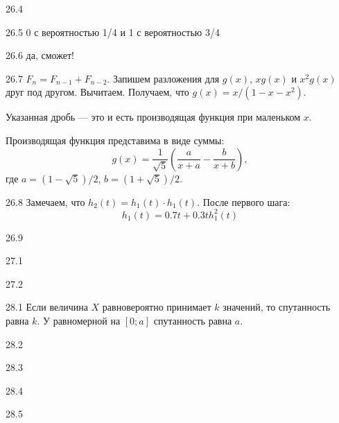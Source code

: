 \protect \hypertarget {soln:26.4}{}
\begin{solution}{{26.4}}
\end{solution}
\protect \hypertarget {soln:26.5}{}
\begin{solution}{{26.5}}
  0 с вероятностью 1/4 и 1 с вероятностью 3/4
\end{solution}
\protect \hypertarget {soln:26.6}{}
\begin{solution}{{26.6}}
  да, сможет!
\end{solution}
\protect \hypertarget {soln:26.7}{}
\begin{solution}{{26.7}}
$F_n = F_{n-1} + F_{n-2}$.
Запишем разложения для $g(x)$, $xg(x)$ и $x^2 g(x)$ друг под другом. Вычитаем. Получаем, что $g(x) = x/(1-x-x^2)$.

Указанная дробь — это и есть производящая функция при маленьком $x$.

Производящая функция представима в виде суммы:
\[
g(x) = \frac{1}{\sqrt{5}}\left( \frac{a}{x+a} - \frac{b}{x+b}  \right),
\]
где $a=(1-\sqrt{5})/2$, $b=(1+\sqrt{5})/2$.
\end{solution}
\protect \hypertarget {soln:26.8}{}
\begin{solution}{{26.8}}
Замечаем, что $h_2(t)=h_1(t)\cdot h_1(t)$. После первого шага:
\[
h_1(t) = 0.7t + 0.3th^2_1(t)
\]
\end{solution}
\protect \hypertarget {soln:26.9}{}
\begin{solution}{{26.9}}

\end{solution}
\protect \hypertarget {soln:27.1}{}
\begin{solution}{{27.1}}
\end{solution}
\protect \hypertarget {soln:27.2}{}
\begin{solution}{{27.2}}
\end{solution}
\protect \hypertarget {soln:28.1}{}
\begin{solution}{{28.1}}
  Если величина $X$ равновероятно принимает $k$ значений, то спутанность равна $k$. У равномерной на $[0;a]$ спутанность равна $a$.
\end{solution}
\protect \hypertarget {soln:28.2}{}
\begin{solution}{{28.2}}
\end{solution}
\protect \hypertarget {soln:28.3}{}
\begin{solution}{{28.3}}
\end{solution}
\protect \hypertarget {soln:28.4}{}
\begin{solution}{{28.4}}
\end{solution}
\protect \hypertarget {soln:28.5}{}
\begin{solution}{{28.5}}
\end{solution}
